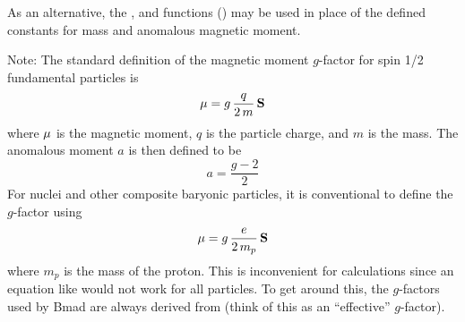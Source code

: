 {{{{{
As an alternative, the , and  functions
() may be used in place of the defined constants for mass and anomalous
magnetic moment.

Note: The standard definition of the magnetic moment $g$-factor for spin 1/2 fundamental particles is
\begin{equation}
  {\bf \mu} = g \, \frac{q}{2 \, m} \, {\bf S}
  \label{mgq2m}
\end{equation}
where ${\bf \mu}$ is the magnetic moment, $q$ is the particle charge, and $m$ is the mass. The
anomalous moment $a$ is then defined to be
\begin{equation}
  a = \frac{g-2}{2}
\end{equation}
For nuclei and other composite baryonic particles, it is conventional to define the $g$-factor using
\begin{equation}
  {\bf \mu} = g \, \frac{e}{2 \, m_p} \, {\bf S}
  \label{mgq2m2}
\end{equation}
where $m_p$ is the mass of the proton. This is inconvenient for calculations since an equation like
 would not work for all particles. To get around this, the $g$-factors used by Bmad are
always derived from  (think of this as an ``effective'' $g$-factor).

}}}}}
